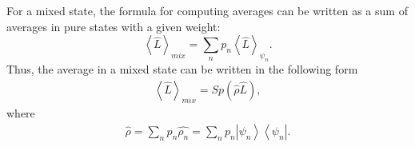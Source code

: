 For a mixed state, the formula for computing averages can be written as a sum of averages in pure states with a given weight:
\[
\left< \hat{L} \right>_{mix} = \sum_n p_n \left< \hat{L} \right>_{\psi_n}. 
\]
Thus, the average in a mixed state can be written in the following form
\begin{eqnarray}
\left< \hat{L} \right>_{mix} = Sp \left(\hat{\rho} \hat{L} \right),
\end{eqnarray}
where
\begin{eqnarray}
\hat{\rho} = \sum_n p_n \hat{\rho_n} = 
\sum_n p_n \left|\psi_n\right>\left<\psi_n\right|.
\end{eqnarray}